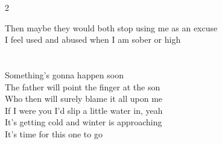 \begin{multicols}{2}
{Then maybe they would both stop using me as an excuse \\
I feel used and abused when I am sober or high \\
\mbox{} \\
\mbox{} \\
Something's gonna happen soon \\
The father will point the finger at the son \\
Who then will surely blame it all upon me \\
If I were you I'd slip a little water in, yeah \\
It's getting cold and winter is approaching \\
It's time for this one to go\par}
\medskip

\end{multicols}


